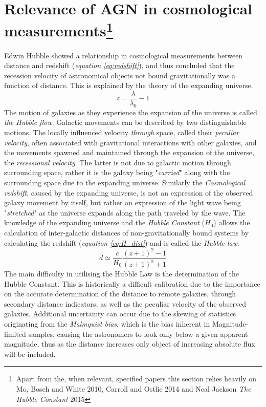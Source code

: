 \documentclass[a4paper, 12pt, twoside]{article}
\begin{document}
\section[Relevance of AGN in cosmological measurements]{Relevance of AGN in cosmological measurements\footnote{Apart from the, when relevant, specified papers this section relies heavily on Mo, Bosch and White 2010, Carroll and Ostlie 2014 and Neal Jackson \emph{The Hubble Constant} 2015}}
Edwin Hubble showed a relationship in cosmological measurements between distance and redshift (\emph{equation \ref{eq:redshift}}), and thus concluded that the recession velocity of astronomical objects not bound gravitationally was a function of distance. This is explained by the theory of the expanding universe.
\begin{equation}
z = \frac{\lambda}{\lambda_{0}}-1
\label{eq:redshift}
\end{equation}
The motion of galaxies as they experience the expansion of the universe is called \emph{the Hubble flow}. Galactic movements can be described by two distinguishable motions. The locally influenced velocity \emph{through} space, called their \emph{peculiar velocity}, often associated with gravitational interactions with other galaxies, and the movements spawned and maintained through the expansion of the universe, the \emph{recessional velocity}. The latter is not due to galactic motion through surrounding space, rather it is the galaxy being "\emph{carried}" along with the surrounding space due to the expanding universe. Similarly the \emph{Cosmological redshift}, caused by the expanding universe, is not an expression of the observed galaxy movement by itself, but rather an expression of the light wave being "\emph{stretched}" as the universe expands along the path traveled by the wave. The knowledge of the expanding universe and the \emph{Hubble Constant} ($H_{0}$) allows the calculation of inter-galactic distances of non-gravitationally bound systems by calculating the redshift (\emph{equation \ref{eq:H_dist}}) and is called the \emph{Hubble law}.
\begin{equation}
d \simeq \frac{c}{H_{0}} \frac{(z+1)^{2}-1}{(z+1)^{2}+1}
\label{eq:H_dist}
\end{equation}
The main difficulty in utilising the Hubble Law is the determination of the Hubble Constant. This is historically a difficult calibration due to the importance on the accurate determination of the distance to remote galaxies, through secondary distance indicators, as well as the peculiar velocity of the observed galaxies. Additional uncertainty can occur due to the skewing of statistics originating from the \emph{Malmquist bias}, which is the bias inherent in Magnitude-limited samples, causing the astronomers to look only below a given apparent magnitude, thus as the distance increases only object of increasing absolute flux will be included. \\
\end{document}
